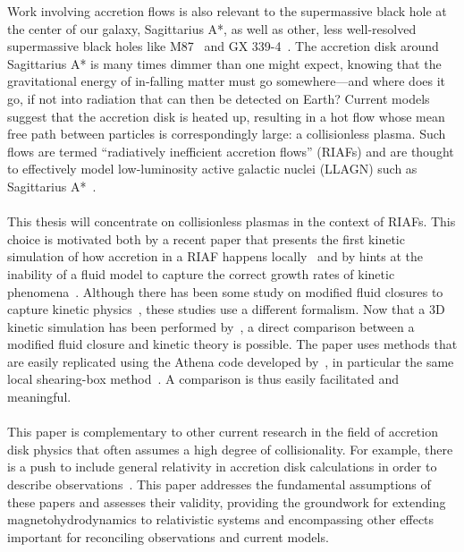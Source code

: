 Work involving accretion flows is also relevant to the supermassive black hole at the center of our galaxy, Sagittarius A*, as well as other, less well-resolved supermassive black holes like M87~\cite{Ressler2015,Oezel2001,Foucart2015,Broderick2015} and GX 339-4~\cite{Plant2014}. The accretion disk around Sagittarius A* is many times dimmer than one might expect, knowing that the gravitational energy of in-falling matter must go somewhere---and where does it go, if not into radiation that can then be detected on Earth? Current models suggest that the accretion disk is heated up, resulting in a hot flow whose mean free path between particles is correspondingly large: a collisionless plasma. Such flows are termed ``radiatively inefficient accretion flows'' (RIAFs) and are thought to effectively model low-luminosity active galactic nuclei (LLAGN) such as Sagittarius A*~\cite{Rohan1998,Broderick2011,Broderick2009,Dexter2013,Yuan2003}. \\
\\
This thesis will concentrate on collisionless plasmas in the context of RIAFs. This choice is motivated both by a recent paper that presents the first kinetic simulation of how accretion in a RIAF happens locally~\cite{Kunz2016} and by hints at the inability of a fluid model to capture the correct growth rates of kinetic phenomena~\cite{Sharma2004}. Although there has been some study on modified fluid closures to capture kinetic physics~\cite{Sharma2006,Sharma2007,Sharma2003,SharmaThesis}, these studies use a different formalism. Now that a 3D kinetic simulation has been performed by~\citet{Kunz16}, a direct comparison between a modified fluid closure and kinetic theory is possible. The paper uses methods that are easily replicated using the Athena code developed by~\citet{Stone2008}, in particular the same local shearing-box method~\cite{Stone2010}. A comparison is thus easily facilitated and meaningful. \\
\\
This paper is complementary to other current research in the field of accretion disk physics that often assumes a high degree of collisionality. For example, there is a push to include general relativity in accretion disk calculations in order to describe observations~\cite{Moscibrodzka2014,Ressler2015,Shiokawa2013,Sadowski2016,Niedzwiecki2014,Narayan1998}. This paper addresses the fundamental assumptions of these papers and assesses their validity, providing the groundwork for extending magnetohydrodynamics to relativistic systems and encompassing other effects important for reconciling observations and current models.\\
